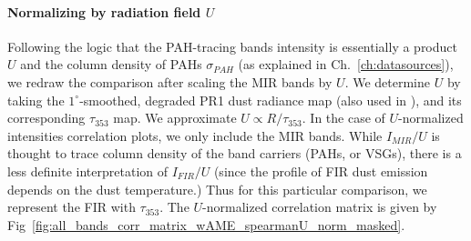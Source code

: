         \paragraph{Normalizing by radiation field $U$}
          Following the logic that the PAH-tracing bands intensity is essentially a product $U$ and the column density of PAHs $\sigma_{PAH}$ (as explained in Ch.~\ref{ch:datasources}), we redraw the comparison after scaling the MIR bands by $U$. We determine $U$ by taking the $1^{\circ}$-smoothed, degraded PR1 dust radiance map (also used in \citep{hensley16}), and its corresponding $\tau_{353}$ map. We approximate $U \propto R/\tau_{353}$. In the case of $U$-normalized intensities correlation plots, we only include the MIR bands. While $I_{MIR}/U$ is thought to trace column density of the band carriers (PAHs, or VSGs), there is a less definite interpretation of $I_{FIR}/U$ (since the profile of FIR dust emission depends on the dust temperature.) Thus for this particular comparison, we represent the FIR with $\tau_{353}$. The $U$-normalized correlation matrix is given by Fig~\ref{fig:all_bands_corr_matrix_wAME_spearmanU_norm_masked}.
